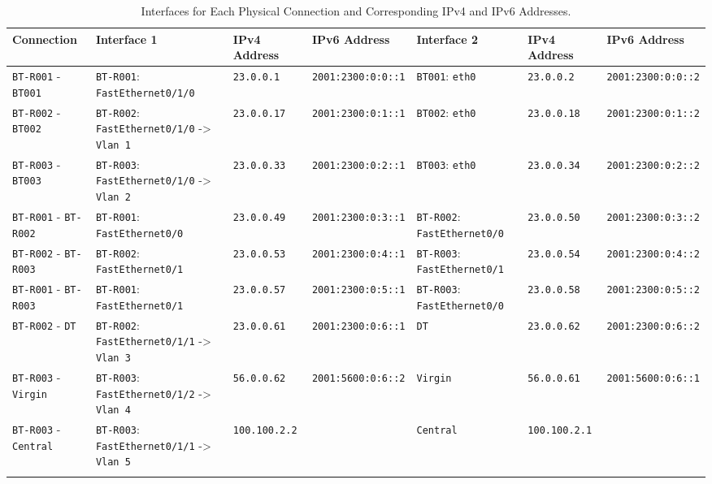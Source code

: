 \begin{landscape}
\scriptsize{
\begin{longtable}[]{@{}lllllll@{}}
\toprule
Connection & Interface 1 & IPv4 Address & IPv6 Address & Interface 2 & IPv4 Address & IPv6
Address \tabularnewline
\midrule
\endhead
\texttt{BT-R001} - \texttt{BT001} & \texttt{BT-R001}:
\texttt{FastEthernet0/1/0} & \texttt{23.0.0.1} &
\texttt{2001:2300:0:0::1} & \texttt{BT001}: \texttt{eth0} &
\texttt{23.0.0.2} & \texttt{2001:2300:0:0::2}\tabularnewline
\texttt{BT-R002} - \texttt{BT002} & \texttt{BT-R002}:
\texttt{FastEthernet0/1/0} -\textgreater{} \texttt{Vlan\ 1} &
\texttt{23.0.0.17} & \texttt{2001:2300:0:1::1} & \texttt{BT002}:
\texttt{eth0} & \texttt{23.0.0.18} &
\texttt{2001:2300:0:1::2}\tabularnewline
\texttt{BT-R003} - \texttt{BT003} & \texttt{BT-R003}:
\texttt{FastEthernet0/1/0} -\textgreater{} \texttt{Vlan\ 2} &
\texttt{23.0.0.33} & \texttt{2001:2300:0:2::1} & \texttt{BT003}:
\texttt{eth0} & \texttt{23.0.0.34} &
\texttt{2001:2300:0:2::2}\tabularnewline
\texttt{BT-R001} - \texttt{BT-R002} & \texttt{BT-R001}:
\texttt{FastEthernet0/0} & \texttt{23.0.0.49} &
\texttt{2001:2300:0:3::1} & \texttt{BT-R002}: \texttt{FastEthernet0/0} &
\texttt{23.0.0.50} & \texttt{2001:2300:0:3::2}\tabularnewline
\texttt{BT-R002} - \texttt{BT-R003} & \texttt{BT-R002}:
\texttt{FastEthernet0/1} & \texttt{23.0.0.53} &
\texttt{2001:2300:0:4::1} & \texttt{BT-R003}: \texttt{FastEthernet0/1} &
\texttt{23.0.0.54} & \texttt{2001:2300:0:4::2}\tabularnewline
\texttt{BT-R001} - \texttt{BT-R003} & \texttt{BT-R001}:
\texttt{FastEthernet0/1} & \texttt{23.0.0.57} &
\texttt{2001:2300:0:5::1} & \texttt{BT-R003}: \texttt{FastEthernet0/0} &
\texttt{23.0.0.58} & \texttt{2001:2300:0:5::2}\tabularnewline
\texttt{BT-R002} - \texttt{DT} & \texttt{BT-R002}:
\texttt{FastEthernet0/1/1} -\textgreater{} \texttt{Vlan\ 3} &
\texttt{23.0.0.61} & \texttt{2001:2300:0:6::1} & \texttt{DT} &
\texttt{23.0.0.62} & \texttt{2001:2300:0:6::2}\tabularnewline
\texttt{BT-R003} - \texttt{Virgin} & \texttt{BT-R003}:
\texttt{FastEthernet0/1/2} -\textgreater{} \texttt{Vlan\ 4} &
\texttt{56.0.0.62} & \texttt{2001:5600:0:6::2} & \texttt{Virgin} &
\texttt{56.0.0.61} & \texttt{2001:5600:0:6::1}\tabularnewline
\texttt{BT-R003} - \texttt{Central} & \texttt{BT-R003}:
\texttt{FastEthernet0/1/1} -\textgreater{} \texttt{Vlan\ 5} &
\texttt{100.100.2.2} & & \texttt{Central} & \texttt{100.100.2.1}
&\tabularnewline
\bottomrule
\caption{Interfaces for Each Physical Connection and Corresponding IPv4 and IPv6 Addresses.}
\label{tab:interfaces}
\end{longtable}
}

\end{landscape}






